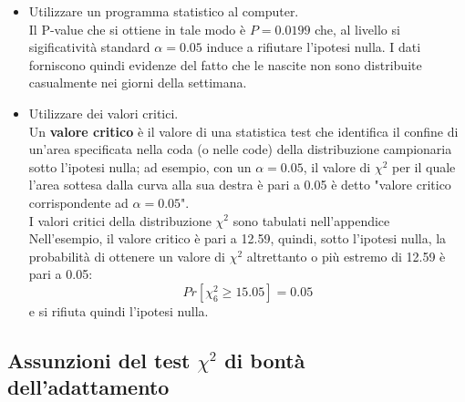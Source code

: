 \documentclass[drafts, 10pt]{book}
\begin{document}
\begin{itemize}
    \item Utilizzare un programma statistico al computer.
    \\
    Il P-value che si ottiene in tale modo è $P = 0.0199$ che, al livello si sigificatività standard $\alpha = 0.05$ induce a rifiutare l'ipotesi nulla. I dati forniscono quindi evidenze del fatto che le nascite non sono distribuite casualmente nei giorni della settimana.
    \item Utilizzare dei valori critici.
    \\
    Un \textbf{valore critico} è il valore di una statistica test che identifica il confine di un'area specificata nella coda (o nelle code) della distribuzione campionaria sotto l'ipotesi nulla; ad esempio, con un $\alpha = 0.05$, il valore di $\chi^2$ per il quale l'area sottesa dalla curva alla sua destra è pari a 0.05 è detto "valore critico corrispondente ad $\alpha = 0.05$".
    \\
    I valori critici della distribuzione $\chi^2$ sono tabulati nell'appendice %
    \\
    Nell'esempio, il valore critico è pari a 12.59, quindi, sotto l'ipotesi nulla, la probabilità di ottenere un valore di $\chi^2$ altrettanto o più estremo di 12.59 è pari a 0.05:
    \begin{equation}
    Pr[\chi^2_6 \ge 15.05] = 0.05
    \end{equation}
    e si rifiuta quindi l'ipotesi nulla.
\end{itemize}

\subsection{Assunzioni del test \texorpdfstring{$\chi^2$}{Lg} di bontà dell'adattamento}
\end{document}

